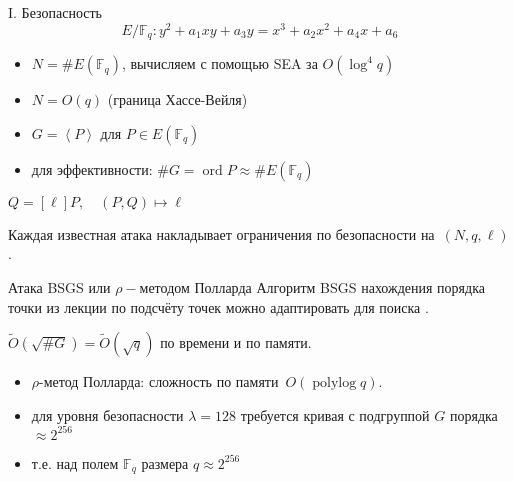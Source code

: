 \documentclass{beamer}
\begin{document}
\begin{frame}{I. Безопасность}
\[
E/\mathbb{F}_q: y^2 + a_1 x y + a_3 y = x^3 + a_2 x^2 + a_4 x + a_6
\]
\begin{itemize}
    \item $N = \#E(\mathbb{F}_q)$, вычисляем с помощью SEA за $O(\log^4{q})$
    \item $N = O(q)$ (граница Хассе-Вейля)
\end{itemize}

\begin{itemize}
    \item $G = \left<P\right>$ для $P \in E(\mathbb{F}_q)$
    \item для эффективности: $\#G = \operatorname{ord}{P} \approx \#E(\mathbb{F}_q)$
\end{itemize}

\vspace{0.5em}

$
Q = [\ell] P, \quad (P, Q) \mapsto \ell
$
\vspace{0.5em}

Каждая известная атака накладывает ограничения по безопасности на~$(N,q,\ell)$.

\end{frame}

\begin{frame}{Атака BSGS или $\rho-$методом Полларда}
        Алгоритм BSGS нахождения порядка точки из лекции по подсчёту точек можно адаптировать для поиска .
    \vspace{1em}
    
     $\widetilde{O}(\sqrt{\#G}) = \widetilde{O}(\sqrt{q})$ по времени и по памяти.
    \begin{itemize}
        \item $\rho$-метод Полларда: сложность по памяти~$O(\operatorname{polylog} q)$.
    \end{itemize}
    
    \vspace{1em}
    \begin{itemize}
    	\item для уровня безопасности $\lambda = 128$ требуется кривая с подгруппой $G$ порядка $\approx 2^{256}$
    	\item т.е. над полем $\mathbb{F}_q$ размера $q \approx 2^{256}$
    \end{itemize}
\end{frame}
\end{document}
